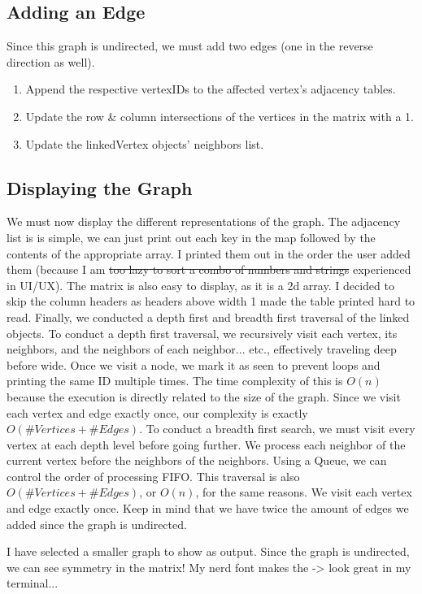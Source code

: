 \documentclass[letterpaper, 10pt]{article}
\begin{document}
\subsection{Adding an Edge}
Since this graph is undirected, we must add two edges (one in the reverse direction as well).
\begin{enumerate}
    \item Append the respective vertexIDs to the affected vertex's adjacency tables.
    \item Update the row \& column intersections of the vertices in the matrix with a 1.
    \item Update the linkedVertex objects' neighbors list.
\end{enumerate}


\subsection{Displaying the Graph}
We must now display the different representations of the graph. The adjacency list is is simple, we can just print out each key in the map followed by the contents of the appropriate array. I printed them out in the order the user added them (because I am \sout{too lazy to sort a combo of numbers and strings} experienced in UI/UX). The matrix is also easy to display, as it is a 2d array. I decided to skip the column headers as headers above width 1 made the table printed hard to read. Finally, we conducted a depth first and breadth first traversal of the linked objects. \newline \indent To conduct a depth first traversal, we recursively visit each vertex, its neighbors, and the neighbors of each neighbor... etc., effectively traveling deep before wide. Once we visit a node, we mark it as seen to prevent loops and printing the same ID multiple times. The time complexity of this is $O(n)$ because the execution is directly related to the size of the graph. Since we visit each vertex and edge exactly once, our complexity is exactly $O(\#Vertices + \#Edges)$. \newline \indent To conduct a breadth first search, we must visit every vertex at each depth level before going further. We process each neighbor of the current vertex before the neighbors of the neighbors. Using a Queue, we can control the order of processing FIFO. This traversal is also $O(\#Vertices + \#Edges)$, or $O(n)$, for the same reasons. We visit each vertex and edge exactly once. Keep in mind that we have twice the amount of edges we added since the graph is undirected.

I have selected a smaller graph to show as output. Since the graph is undirected, we can see symmetry in the matrix! My nerd font makes the -\textgreater{} look great in my terminal...

\end{document}
